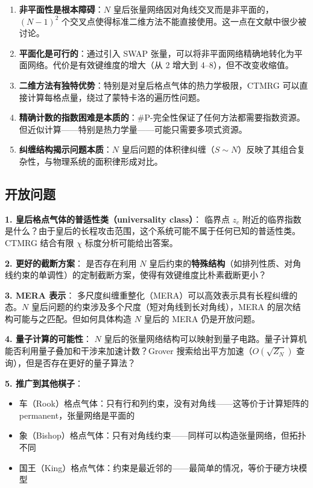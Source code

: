 \documentclass[12pt,a4paper]{ctexart}
\begin{document}
\begin{enumerate}
\item \textbf{非平面性是根本障碍}：$N$ 皇后张量网络因对角线交叉而是非平面的，$(N-1)^2$ 个交叉点使得标准二维方法不能直接使用。这一点在文献中很少被讨论。

\item \textbf{平面化是可行的}：通过引入 SWAP 张量，可以将非平面网络精确地转化为平面网络。代价是有效键维度的增大（从 2 增大到 4--8），但不改变收缩值。

\item \textbf{二维方法有独特优势}：特别是对皇后格点气体的热力学极限，CTMRG 可以直接计算每格点量，绕过了蒙特卡洛的遍历性问题。

\item \textbf{精确计数的指数困难是本质的}：\#P-完全性保证了任何方法都需要指数资源。但近似计算——特别是热力学量——可能只需要多项式资源。

\item \textbf{纠缠结构揭示问题本质}：$N$ 皇后问题的体积律纠缠（$S \sim N$）反映了其组合复杂性，与物理系统的面积律形成对比。
\end{enumerate}

\subsection{开放问题}

\textbf{1. 皇后格点气体的普适性类（universality class）}：
临界点 $z_c$ 附近的临界指数是什么？由于皇后的长程攻击范围，这个系统可能不属于任何已知的普适性类。CTMRG 结合有限 $\chi$ 标度分析可能给出答案。

\textbf{2. 更好的截断方案}：
是否存在利用 $N$ 皇后约束的\textbf{特殊结构}（如排列性质、对角线约束的单调性）的定制截断方案，使得有效键维度比朴素截断更小？

\textbf{3. MERA 表示}：
多尺度纠缠重整化（MERA）可以高效表示具有长程纠缠的态。$N$ 皇后问题的约束涉及多个尺度（短对角线到长对角线），MERA 的层次结构可能与之匹配。但如何具体构造 $N$ 皇后的 MERA 仍是开放问题。

\textbf{4. 量子计算的可能性}：
$N$ 皇后的张量网络结构可以映射到量子电路。量子计算机能否利用量子叠加和干涉来加速计数？Grover 搜索给出平方加速（$O(\sqrt{Z_N})$ 查询），但是否存在更好的量子算法？

\textbf{5. 推广到其他棋子}：
\begin{itemize}
\item 车（Rook）格点气体：只有行和列约束，没有对角线——这等价于计算矩阵的 permanent，张量网络是平面的
\item 象（Bishop）格点气体：只有对角线约束——同样可以构造张量网络，但拓扑不同
\item 国王（King）格点气体：约束是最近邻的——最简单的情况，等价于硬方块模型
\end{itemize}
\end{document}
